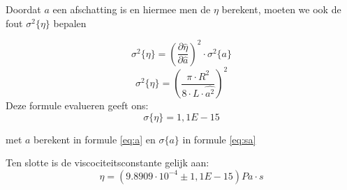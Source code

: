 Doordat $a$ een afschatting is en hiermee men de $\eta$ berekent,
moeten we ook de fout $\sigma ^2 \{ \eta \}$ bepalen

\begin{equation}
    \sigma ^2 \{ \eta \} = \left(\frac{\partial \hat{\eta}}{\partial \hat{a}}\right)^2 \cdot \sigma ^2 \{a\}
\end{equation}
\begin{equation*}
    \sigma ^2 \{ \eta \} = \left(\frac{\pi \cdot R^2}{8 \cdot L \cdot \hat{a^2}}\right)^2
\end{equation*}
Deze formule evalueren geeft ons:
\begin{equation*}
    \sigma \{ \eta \} = 1,1E-15
\end{equation*}

met $a$ berekent in formule \eqref{eq:a} en $\sigma \{a\}$ in formule \eqref{eq:sa}

Ten slotte is de viscociteitsconstante gelijk aan:
\begin{equation*}
    \eta = (9.8909 \cdot 10^{-4} \pm 1,1E-15)Pa \cdot s
\end{equation*}



